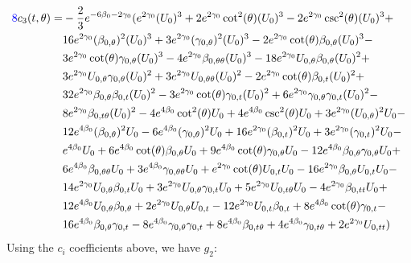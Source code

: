 \documentclass[a4paper,11pt]{article}
\numberwithin{equation}{section}
\begin{document}
\begin{subequations}
\begin{align}
\begin{split}
\textcolor{blue}{8}c_3(t,\theta)=&-\frac{2}{3} e^{-6\beta_{0}-2 \gamma_{0}} (e^{2 \gamma_{0}} (U_{0})^3+2 e^{2 \gamma_{0}} \cot ^2(\theta ) (U_{0})^3-2 e^{2 \gamma_{0}} \csc ^2(\theta ) (U_{0})^3+\\
&16 e^{2 \gamma_{0}} (\beta_{0, \theta})^2 (U_{0})^3+3 e^{2 \gamma_{0}} (\gamma_{0, \theta})^2 (U_{0})^3-2 e^{2 \gamma_{0}} \cot (\theta )\beta_{0, \theta} (U_{0})^3-\\
&3 e^{2 \gamma_{0}} \cot (\theta ) \gamma_{0, \theta} (U_{0})^3-4 e^{2 \gamma_{0}}\beta_{0, \theta \theta} (U_{0})^3-18 e^{2 \gamma_{0}} U_{0, \theta}\beta_{0, \theta} (U_{0})^2+\\
&3 e^{2 \gamma_{0}} U_{0, \theta} \gamma_{0, \theta} (U_{0})^2+3 e^{2 \gamma_{0}} U_{0, \theta \theta} (U_{0})^2-2 e^{2 \gamma_{0}} \cot (\theta )\beta_{0, t} (U_{0})^2+\\
&32 e^{2 \gamma_{0}}\beta_{0, \theta}\beta_{0, t} (U_{0})^2-3 e^{2 \gamma_{0}} \cot (\theta ) \gamma_{0, t} (U_{0})^2+6 e^{2 \gamma_{0}} \gamma_{0, \theta} \gamma_{0, t} (U_{0})^2-\\
&8 e^{2 \gamma_{0}}\beta_{0, t \theta} (U_{0})^2-4 e^{4\beta_{0}} \cot ^2(\theta ) U_{0}+4 e^{4\beta_{0}} \csc ^2(\theta ) U_{0}+3 e^{2 \gamma_{0}} (U_{0, \theta})^2 U_{0}-\\
&12 e^{4\beta_{0}} (\beta_{0, \theta})^2 U_{0}-6 e^{4\beta_{0}} (\gamma_{0, \theta})^2 U_{0}+16 e^{2 \gamma_{0}} (\beta_{0, t})^2 U_{0}+3 e^{2 \gamma_{0}} (\gamma_{0, t})^2 U_{0}-\\
&e^{4\beta_{0}} U_{0}+6 e^{4\beta_{0}} \cot (\theta )\beta_{0, \theta} U_{0}+9 e^{4\beta_{0}} \cot (\theta ) \gamma_{0, \theta} U_{0}-12 e^{4\beta_{0}}\beta_{0, \theta} \gamma_{0, \theta} U_{0}+\\
&6 e^{4\beta_{0}}\beta_{0, \theta \theta} U_{0}+3 e^{4\beta_{0}} \gamma_{0, \theta \theta} U_{0}+e^{2 \gamma_{0}} \cot (\theta ) U_{0, t} U_{0}-16 e^{2 \gamma_{0}}\beta_{0, \theta} U_{0, t} U_{0}-\\
&14 e^{2 \gamma_{0}} U_{0, \theta}\beta_{0, t} U_{0}+3 e^{2 \gamma_{0}} U_{0, \theta} \gamma_{0, t} U_{0}+5 e^{2 \gamma_{0}} U_{0, t \theta} U_{0}-4 e^{2 \gamma_{0}}\beta_{0, t t} U_{0}+\\
&12 e^{4\beta_{0}} U_{0, \theta}\beta_{0, \theta}+2 e^{2 \gamma_{0}} U_{0, \theta} U_{0, t}-12 e^{2 \gamma_{0}} U_{0, t}\beta_{0, t}+8 e^{4\beta_{0}} \cot (\theta ) \gamma_{0, t}-\\
&16 e^{4\beta_{0}}\beta_{0, \theta} \gamma_{0, t}-8 e^{4\beta_{0}} \gamma_{0, \theta} \gamma_{0, t}+8 e^{4\beta_{0}}\beta_{0, t \theta}+4 e^{4\beta_{0}} \gamma_{0, t \theta}+2 e^{2 \gamma_{0}} U_{0, t t})
\end{split}
\end{align}
\end{subequations}
\noindent Using the $c_i$ coefficients above, we have $g_{2}$:
\end{document}
